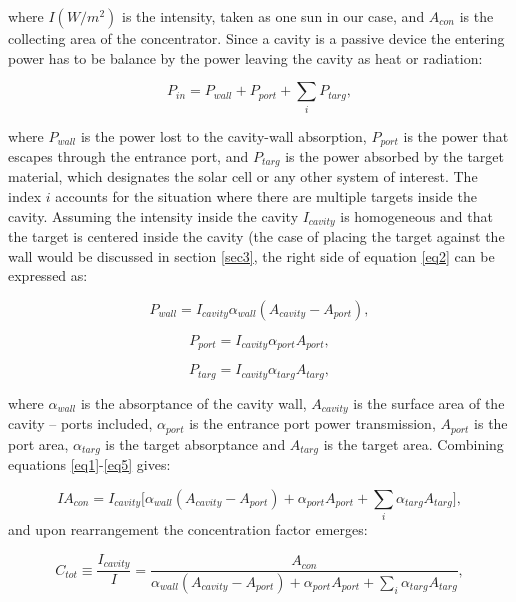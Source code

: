 \documentclass[a4paper]{article}
\begin{document}
\noindent where $I (W/m^2)$ is the intensity, taken as one sun in our case, and $A_{con}$ is the collecting area of the concentrator. Since a cavity is a passive device the entering power has to be balance by the power leaving the cavity as heat or radiation:

\begin{equation}\label{eq2}
P_{in}=P_{wall}+P_{port}+\sum_{i} P_{targ},
\end{equation}

\noindent where $P_{wall}$ is the power lost to the cavity-wall absorption, $P_{port}$ is the power that escapes through the entrance port, and $P_{targ}$ is the power absorbed by the target material, which designates the solar cell or any other system of interest. The index $i$ accounts for the situation where there are multiple targets inside the cavity. Assuming the intensity inside the cavity $I_{cavity}$ is homogeneous and that the target is centered inside the cavity (the case of placing the target against the wall would be discussed in section \ref{sec3}, the right side of equation \ref{eq2} can be expressed as:

\begin{equation}\label{eq3}
P_{wall}=I_{cavity}\alpha_{wall}(A_{cavity}-A_{port}),
\end{equation}

\begin{equation}\label{eq4}
P_{port}=I_{cavity}\alpha_{port}A_{port},
\end{equation}

\begin{equation}\label{eq5}
P_{targ}=I_{cavity}\alpha_{targ}A_{targ},
\end{equation}

\noindent where $\alpha_{wall}$ is the absorptance of the cavity wall, $A_{cavity}$ is the surface area of the cavity – ports included, $\alpha_{port}$ is the entrance port power transmission, $A_{port}$ is the port area, $\alpha_{targ}$ is the target absorptance and $A_{targ}$ is the target area. 
Combining equations \ref{eq1}-\ref{eq5} gives:

\begin{equation}\label{eq6}
IA_{con}=I_{cavity}\Big[\alpha_{wall}(A_{cavity}-A_{port})+\alpha_{port}A_{port}+\sum_{i}\alpha_{targ}A_{targ}\Big],
\end{equation}
\noindent and upon rearrangement the concentration factor emerges:

\begin{equation}\label{eq7}
C_{tot} \equiv \frac{I_{cavity}}{I} = \frac{A_{con}}{\alpha_{wall}(A_{cavity}-A_{port})+\alpha_{port}A_{port} + \sum_{i}\alpha_{targ}A_{targ}},
\end{equation}
\end{document}
